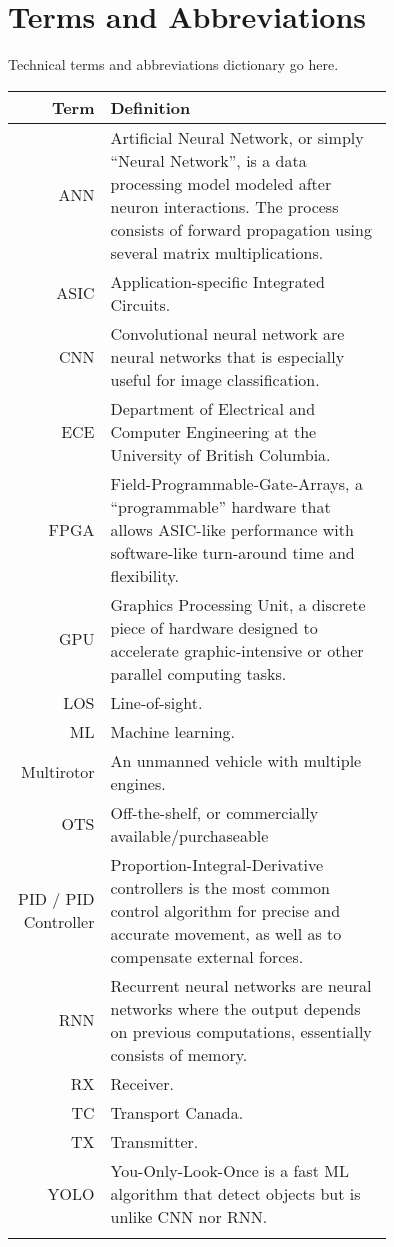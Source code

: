 \thispagestyle{empty}

\section*{Terms and Abbreviations}

Technical terms and abbreviations dictionary go here.

\begin{tabular}[h]{rp{0.75\linewidth}}
    \hline
    \textbf{Term} & \textbf{Definition}\\
    \hline

    ANN & Artificial Neural Network, or simply ``Neural Network'', is a data processing model modeled after neuron interactions. The process consists of forward propagation using several matrix multiplications.\cite{ann}\\
    ASIC & Application-specific Integrated Circuits.\\
    CNN & Convolutional neural network are neural networks that is especially useful for image classification.\cite{cnn} \\
    ECE & Department of Electrical and Computer Engineering at the University of British Columbia.\\
    FPGA & Field-Programmable-Gate-Arrays, a ``programmable'' hardware that allows ASIC-like performance with software-like turn-around time and flexibility.\\
    GPU & Graphics Processing Unit, a discrete piece of hardware designed to accelerate graphic-intensive or other parallel computing tasks.\\
    LOS & Line-of-sight.\\
    ML & Machine learning.\\
    Multirotor & An unmanned vehicle with multiple engines. \\
    OTS & Off-the-shelf, or commercially available/purchaseable \\
    PID / PID Controller & Proportion-Integral-Derivative controllers is the most common control algorithm for precise and accurate movement, as well as to compensate external forces.\cite{pid}\\
    RNN & Recurrent neural networks are neural networks where the output depends on previous computations, essentially consists of memory.\cite{rnn}\\
    RX & Receiver.\\
    TC & Transport Canada.\\
    TX & Transmitter.\\
    YOLO & You-Only-Look-Once is a fast ML algorithm that detect objects but is unlike CNN nor RNN.\cite{yolo}\cite{yolo-2}\\
     & \\

    \hline

\end{tabular}
